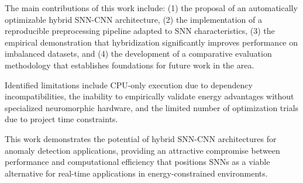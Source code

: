 The main contributions of this work include: (1) the proposal of an automatically optimizable hybrid SNN-CNN architecture, (2) the implementation of a reproducible preprocessing pipeline adapted to SNN characteristics, (3) the empirical demonstration that hybridization significantly improves performance on imbalanced datasets, and (4) the development of a comparative evaluation methodology that establishes foundations for future work in the area.

Identified limitations include CPU-only execution due to dependency incompatibilities, the inability to empirically validate energy advantages without specialized neuromorphic hardware, and the limited number of optimization trials due to project time constraints.

This work demonstrates the potential of hybrid SNN-CNN architectures for anomaly detection applications, providing an attractive compromise between performance and computational efficiency that positions SNNs as a viable alternative for real-time applications in energy-constrained environments.